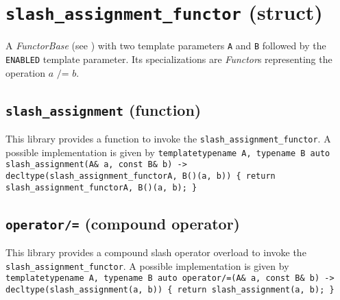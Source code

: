 
\section{\texttt{slash\_assignment\_functor} (struct)}
A \textit{FunctorBase} (see \cite{functors}) with two template parameters \texttt{A} and \texttt{B} followed by the \texttt{ENABLED} template parameter.
Its specializations are \textit{Functor}s representing the operation $\textit{a /= b}$.

\subsection{\texttt{slash\_assignment} (function)}
This library provides a function to invoke the \texttt{slash\_assignment\_functor}.
A possible implementation is given by\newline
\texttt{template\textlangle typename A, typename B\textrangle\newline
auto\newline
slash\_assignment(A\& a, const B\& b)\newline
-> decltype(slash\_assignment\_functor\textlangle A, B\textrangle()(a, b))\newline
\{ return slash\_assignment\_functor\textlangle A, B\textrangle()(a, b); \}}

\subsection{\texttt{operator/=} (compound operator)}
This library provides a compound slash operator overload to invoke the \texttt{slash\_assignment\_functor}.
A possible implementation is given by\newline
\texttt{template\textlangle typename A, typename B\textrangle\newline
auto\newline
operator/=(A\& a, const B\& b)\newline
-> decltype(slash\_assignment(a, b))\newline
\{ return slash\_assignment(a, b); \}}
